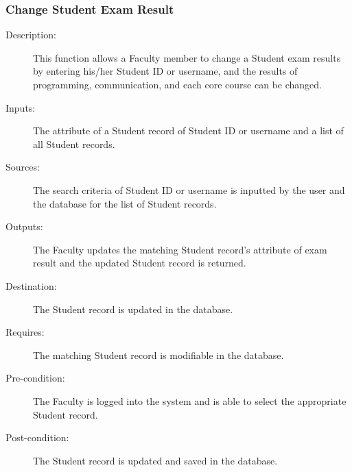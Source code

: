 \subsubsection{\large Change Student Exam Result }
\begin{boxed} %
\small\begin{description}
\item[Description:]
   This function allows a Faculty member to change a Student exam results by
   entering his/her Student ID or username, and the results of programming,
   communication, and each core course can be changed.
\item[Inputs:]
   The attribute of a Student record of Student ID or username and a list of all
   Student records.
\item[Sources:]
   The search criteria of Student ID or username is inputted by the user and the
   database for the list of Student records.
\item[Outputs:]
   The Faculty updates the matching Student record's attribute of exam result
   and the updated Student record is returned.
\item[Destination:]
   The Student record is updated in the database.
\item[Requires:]
   The matching Student record is modifiable in the database.
\item[Pre-condition:]
   The Faculty is logged into the system and is able to select the appropriate
   Student record.
\item[Post-condition:]
   The Student record is updated and saved in the database.
\end{description}
\normalsize
\end{boxed} %

